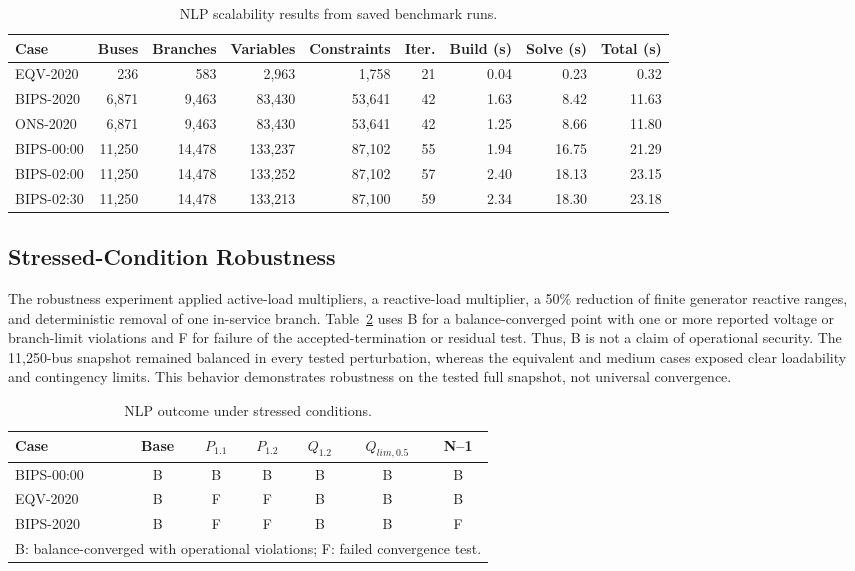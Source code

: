 \documentclass[letterpaper,journal]{IEEEtran}
\begin{document}
\begin{table}[!t]
\centering
\footnotesize
\caption{NLP scalability results from saved benchmark runs.}
\label{tab:scalability}
\setlength{\tabcolsep}{5pt}
\begin{tabular}{lrrrrrrrr}
\hline
\textbf{Case} & \textbf{Buses} & \textbf{Branches} & \textbf{Variables} & \textbf{Constraints} & \textbf{Iter.} & \textbf{Build (s)} & \textbf{Solve (s)} & \textbf{Total (s)} \\ \hline
EQV-2020   & 236    & 583    & 2,963   & 1,758  & 21 & 0.04 & 0.23 & 0.32 \\
BIPS-2020  & 6,871  & 9,463  & 83,430  & 53,641 & 42 & 1.63 & 8.42 & 11.63 \\
ONS-2020   & 6,871  & 9,463  & 83,430  & 53,641 & 42 & 1.25 & 8.66 & 11.80 \\
BIPS-00:00 & 11,250 & 14,478 & 133,237 & 87,102 & 55 & 1.94 & 16.75 & 21.29 \\
BIPS-02:00 & 11,250 & 14,478 & 133,252 & 87,102 & 57 & 2.40 & 18.13 & 23.15 \\
BIPS-02:30 & 11,250 & 14,478 & 133,213 & 87,100 & 59 & 2.34 & 18.30 & 23.18 \\ \hline
\end{tabular}
\end{table}

\subsection{Stressed-Condition Robustness}

The robustness experiment applied active-load multipliers, a reactive-load multiplier, a 50\% reduction of finite generator reactive
ranges, and deterministic removal of one in-service branch. Table~\ref{tab:stress_results} uses B for a balance-converged point with one or
more reported voltage or branch-limit violations and F for failure of the accepted-termination or residual test. Thus, B is not a claim of
operational security. The 11,250-bus snapshot remained balanced in every tested perturbation, whereas the equivalent and medium cases exposed
clear loadability and contingency limits. This behavior demonstrates robustness on the tested full snapshot, not universal convergence.

\begin{table}[!t]
\centering
\footnotesize
\caption{NLP outcome under stressed conditions.}
\label{tab:stress_results}
\setlength{\tabcolsep}{3.5pt}
\begin{tabular}{lcccccc}
\hline
\textbf{Case} & \textbf{Base} & \textbf{$P_{1.1}$} & \textbf{$P_{1.2}$} & \textbf{$Q_{1.2}$} & \textbf{$Q_{lim,0.5}$} & \textbf{N--1} \\ \hline
BIPS-00:00 & B & B & B & B & B & B \\
EQV-2020   & B & F & F & B & B & B \\
BIPS-2020  & B & F & F & B & B & F \\ \hline
\multicolumn{7}{l}{\scriptsize B: balance-converged with operational violations; F: failed convergence test.}
\end{tabular}
\end{table}
\end{document}
